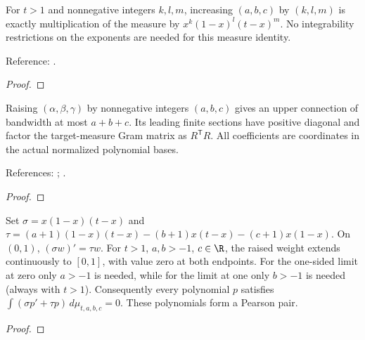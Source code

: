 \begin{theorem}
\label{thm:semiclassical-jacobi-shifts}
\leanok
For $t>1$ and nonnegative integers $k,l,m$, increasing $(a,b,c)$ by $(k,l,m)$
is exactly multiplication of the measure by $x^k(1-x)^l(t-x)^m$.
No integrability restrictions on the exponents are needed for this measure identity.

Reference: \cite[Section 3]{pgso}.
\end{theorem}
\begin{proof}
\leanok
\end{proof}

\begin{theorem}
\label{thm:semiclassical-conversion}
\leanok
Raising $(\alpha,\beta,\gamma)$ by nonnegative integers $(a,b,c)$ gives an upper
connection of bandwidth at most $a+b+c$. Its leading finite sections have positive
diagonal and factor the target-measure Gram matrix as $R^{\mathsf T}R$.
All coefficients are coordinates in the actual normalized polynomial bases.

References: \cite[Theorem 3.2]{pgso}; \cite[Lemma 2.8]{gutleb-olver-slevinsky}.
\end{theorem}
\begin{proof}
\leanok
\end{proof}

\begin{theorem}
\label{thm:semiclassical-jacobi-pearson}
\leanok
Set $\sigma=x(1-x)(t-x)$ and
$\tau=(a+1)(1-x)(t-x)-(b+1)x(t-x)-(c+1)x(1-x)$.
On $(0,1)$, $(\sigma w)'=\tau w$. For $t>1$, $a,b>-1$, $c\in\R$,
the raised weight extends continuously to $[0,1]$, with value zero at both
endpoints. For the one-sided limit at zero only $a>-1$ is needed, while
for the limit at one only $b>-1$ is needed (always with $t>1$).
Consequently every polynomial $p$ satisfies
$\int(\sigma p'+\tau p)\,d\mu_{t,a,b,c}=0$.
These polynomials form a Pearson pair.
\end{theorem}
\begin{proof}
\leanok
\end{proof}

